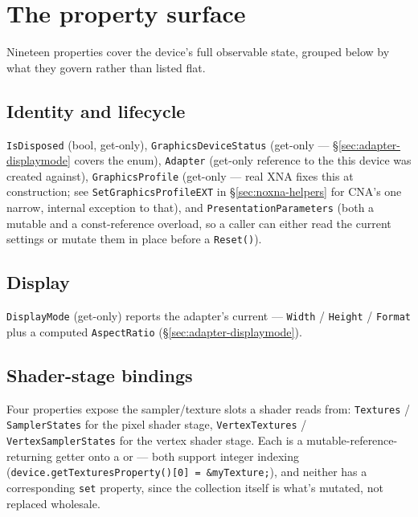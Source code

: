 \section{The property surface}
\label{sec:property-surface}

Nineteen properties cover the device's full observable state, grouped below by what they
govern rather than listed flat.

\subsection{Identity and lifecycle}

\texttt{IsDisposed} (bool, get-only), \texttt{GraphicsDeviceStatus} (get-only ---
\S\ref{sec:adapter-displaymode} covers the enum), \texttt{Adapter} (get-only reference to the
 this device was created against), \texttt{GraphicsProfile} (get-only
--- real XNA fixes this at construction; see \texttt{SetGraphicsProfileEXT} in
\S\ref{sec:noxna-helpers} for CNA's one narrow, internal exception to that), and
\texttt{PresentationParameters} (both a mutable and a const-reference overload, so a caller can
either read the current settings or mutate them in place before a \texttt{Reset()}).

\subsection{Display}

\texttt{DisplayMode} (get-only) reports the adapter's current  ---
\texttt{Width} / \texttt{Height} / \texttt{Format} plus a computed \texttt{AspectRatio}
(\S\ref{sec:adapter-displaymode}).

\subsection{Shader-stage bindings}

Four properties expose the sampler/texture slots a shader reads from:
\texttt{Textures} / \texttt{SamplerStates} for the pixel shader stage,
\texttt{VertexTextures} / \texttt{VertexSamplerStates} for the vertex shader stage. Each is a
mutable-reference-returning getter onto a  or
 --- both support integer indexing
(\texttt{device.getTexturesProperty()[0] = \&myTexture;}), and neither has a corresponding
\texttt{set} property, since the collection itself is what's mutated, not replaced wholesale.

